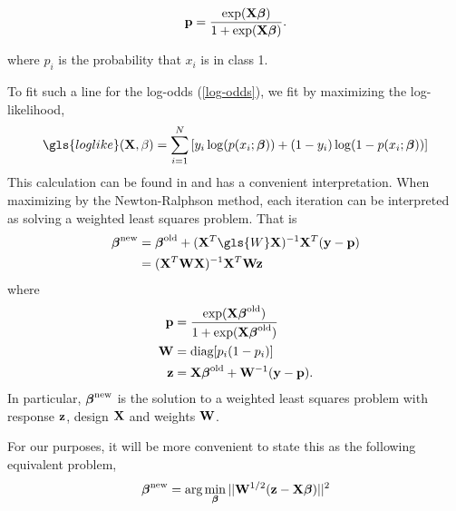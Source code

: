 \documentclass[main.tex]{subfiles}
\begin{document}
\begin{align}
	\mathbf{p} = \dfrac{\text{exp}(\mathbf{X} \boldsymbol \beta)}{1 + \text{exp}(\mathbf{X} \boldsymbol \beta)}.
\end{align}

where $p_i$ is the probability that $x_i$ is in class 1.

To fit such a line for the log-odds (\ref{log-odds}), we fit by maximizing the log-likelihood,
\begin{align}
	\gls{loglike}(\X, \beta) = \sum_{i = 1}^N \left [ y_i \log (p(x_i; \bbeta)) + (1-y_i) \log(1 - p(x_i; \bbeta))\right ] \label{loglikelihood}
\end{align}
This calculation can be found in \citep{ESL} and has a convenient interpretation. When maximizing by the Newton-Ralphson method, each iteration can be interpreted as solving a weighted least squares problem. That is
\begin{align}
    \bbeta^{\new} &= \bbeta^{\old} + (\X^T \gls{W} \X)^{-1} \X^T(\y - \p) \\
    &= (\X^T \W \X)^{-1} \X^T \W \z
\end{align}
where
\begin{align}
	\mathbf{p} &= \dfrac{\text{exp}(\mathbf{X} \boldsymbol \beta^{\text{old}})}{1 + \text{exp}(\mathbf{X} \boldsymbol \beta^{\text{old}})} \label{pdef}\\
    \mathbf{W} &= \text{diag}[p_i(1-p_i)] \label{Wdef}\\
    \mathbf{z} &= \mathbf{X} \boldsymbol \beta^{\text{old}} + \mathbf{W}^{-1}(\mathbf{y} - \mathbf{p}). \label{zdef}
\end{align}
In particular, $\boldsymbol \beta^{\text{new}}$ is the solution to a weighted least squares problem with response $\mathbf{z}$, design $\mathbf{X}$ and weights $\mathbf{W}$.

For our purposes, it will be more convenient to state this as the following equivalent problem,
\begin{align}
    \boldsymbol \beta^{\text{new}} =  \text{arg} \min_{\boldsymbol \beta} ||\mathbf{W}^{1/2}(\mathbf{z} - \mathbf{X} \boldsymbol \beta)||^2
\end{align}
\end{document}

